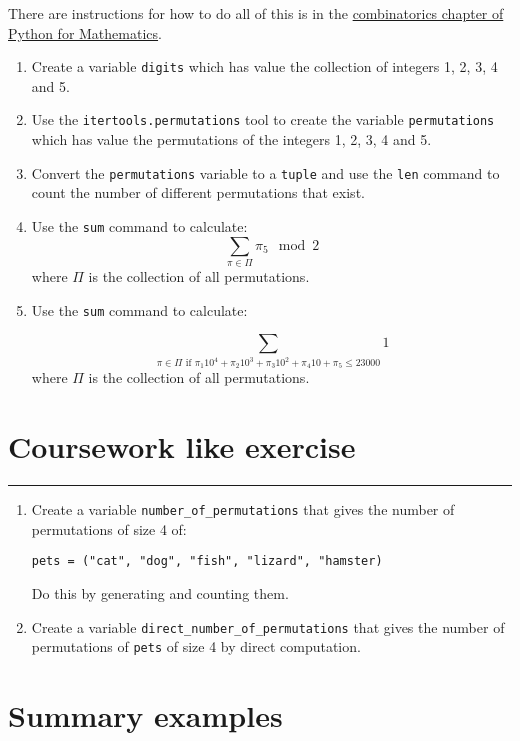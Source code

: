 \documentclass{article}
\begin{document}
There are instructions for how to do all of this is in the
\href{https://vknight.org/pfm/tools-for-mathematics/05-combinations-permutations/how/main.html}{combinatorics chapter of Python for Mathematics}.


\begin{enumerate}
    \item Create a variable \texttt{digits} which has value the
        collection of integers 1, 2, 3, 4 and 5.
\item
    Use the \texttt{itertools.permutations} tool to create the
        variable \texttt{permutations} which has value the
        permutations of the integers 1, 2, 3, 4 and 5. 
    \item Convert the \texttt{permutations} variable to a
        \texttt{tuple} and use the \texttt{len} command
        to count the number of different permutations that exist.
    \item Use the \texttt{sum} command to calculate:
        \[\sum_{\pi \in \Pi}\pi_5\mod 2\] where $\Pi$ is the collection of all
        permutations. 
    \item Use the \texttt{sum} command to calculate:

        \[\sum_{\pi \in \Pi \text{ if }\pi_1 10 ^ 4 + \pi_2 10 ^ 3 + \pi_3 10 ^ 2 + \pi_4 10 + \pi_5 \leq 23000} 1 \] 
        where $\Pi$ is the collection of all
        permutations. 
\end{enumerate}


\section{Coursework like exercise}
\hrule


\begin{enumerate}
    \item Create a variable \texttt{number_of_permutations} that gives the 
number of permutations of size 4 of:

\texttt{pets = ("cat", "dog", "fish", "lizard", "hamster)}

Do this by generating and counting them.
\item Create a variable \texttt{direct_number_of_permutations} that gives 
    the number of permutations of \texttt{pets} of size 4 by 
        direct computation.
\end{enumerate}

\section{Summary examples}
\end{document}
